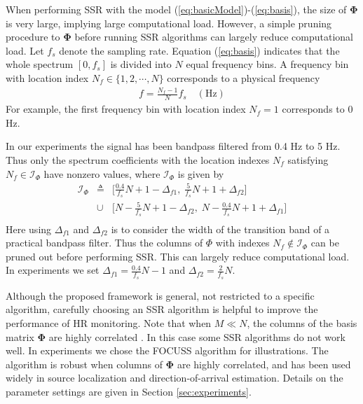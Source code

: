 \documentclass[10pt,twocolumn]{IEEEtran}
\begin{document}
When performing SSR with the model (\ref{eq:basicModel})-(\ref{eq:basis}), the size of $\mathbf{\Phi}$ is very large, implying large computational load. However, a simple pruning procedure to $\mathbf{\Phi}$ before running SSR algorithms can largely reduce computational load. Let $f_s$ denote the sampling rate. Equation (\ref{eq:basis}) indicates that the whole spectrum $[0, f_s]$ is divided into $N$ equal frequency bins. A frequency bin with location index $N_f \in \{1,2,\cdots,N\}$ corresponds to a physical frequency
\begin{eqnarray}
f = \frac{N_f-1}{N} f_s \quad (\mathrm{Hz})
\label{eq:physicalF}
\end{eqnarray}
For example, the first frequency bin with location index $N_f=1$ corresponds to 0 Hz.

In our experiments the signal has been bandpass filtered from 0.4 Hz to 5 Hz. Thus only the spectrum coefficients with the location indexes $N_f$ satisfying $N_f \in \mathcal{I}_{\Phi} $ have nonzero values, where $\mathcal{I}_{\Phi}$ is given by
\begin{eqnarray}
\mathcal{I}_{\Phi} &\triangleq & \Big[\frac{0.4}{f_s}N + 1 - \Delta_{f1}, \; \frac{5}{f_s}N+1+\Delta_{f2} \Big]  \nonumber \\
&  \cup &  \Big[N-\frac{5}{f_s}N+1-\Delta_{f2}, \; N-\frac{0.4}{f_s}N+1+\Delta_{f1} \Big] \nonumber \\
\end{eqnarray}
Here using $\Delta_{f1}$ and $\Delta_{f2}$ is to consider the width of the transition band of a practical bandpass filter. Thus the columns of $\Phi$ with indexes $N_f \not\in \mathcal{I}_{\Phi}$ can be pruned out before performing SSR. This can largely reduce computational load. In experiments we set $\Delta_{f1} = \frac{0.4}{f_s}N-1$ and $\Delta_{f2}=\frac{2}{f_s}N$.






Although the proposed framework is general, not restricted to a specific algorithm, carefully choosing an SSR algorithm is helpful to improve the performance of HR monitoring. Note that when $M \ll N$, the columns of the basis matrix $\mathbf{\Phi}$ are highly correlated \cite{duarte2013spectral}. In this case some SSR algorithms do not work well. In experiments we chose the FOCUSS algorithm \cite{Gorodnitsky1997} for illustrations. The algorithm is robust when columns of $\mathbf{\Phi}$ are highly correlated, and has been used widely in source localization and direction-of-arrival estimation. Details on the parameter settings are given in Section \ref{sec:experiments}.
\end{document}
